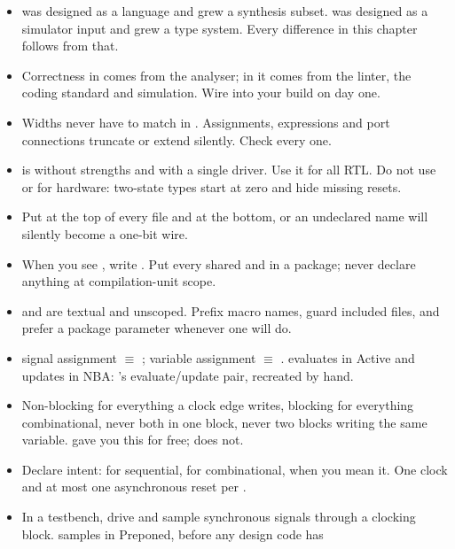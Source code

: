 \begin{itemize}
\item \VHDL{} was designed as a language and grew a synthesis subset. \SV{}
  was designed as a simulator input and grew a type system. Every difference
  in this chapter follows from that.
\item Correctness in \VHDL{} comes from the analyser; in \SV{} it comes from
  the linter, the coding standard and simulation. Wire
   into your build on day one.
\item Widths never have to match in \SV{}. Assignments, expressions and port
  connections truncate or extend silently. Check every one.
\item {} is  without strengths and with a single
  driver. Use it for all RTL. Do not use  or  for hardware:
  two-state types start at zero and hide missing resets.
\item Put  at the top of every file and
   at the bottom, or an undeclared name will
  silently become a one-bit wire.
\item When you see , write
  . Put every shared  and
   in a package; never declare anything at compilation-unit
  scope.
\item {} and  are textual and unscoped. Prefix
  macro names, guard included files, and prefer a package parameter whenever
  one will do.
\item \VHDL{} signal assignment $\equiv$ \SV{} \code{<=}; \VHDL{} variable
  assignment $\equiv$ \SV{} \code{=}. \code{<=} evaluates in Active and updates
  in NBA: \VHDL{}'s evaluate/update pair, recreated by hand.
\item Non-blocking for everything a clock edge writes, blocking for everything
  combinational, never both in one block, never two blocks writing the same
  variable. \VHDL{} gave you this for free; \SV{} does not.
\item Declare intent:  for sequential,  for
  combinational,  when you mean it. One clock and at most
  one asynchronous reset per .
\item In a testbench, drive and sample synchronous signals through a clocking
  block.  samples in Preponed, before any design code has

\end{itemize}
